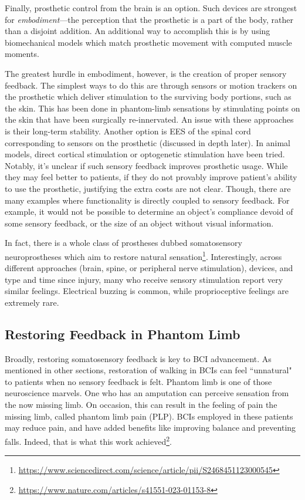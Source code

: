 Finally, prosthetic control from the brain is an option. Such devices are strongest for \textit{embodiment}---the perception that the prosthetic is a part of the body, rather than a disjoint addition. An additional way to accomplish this is by using biomechanical models which match prosthetic movement with computed muscle moments.\newline

The greatest hurdle in embodiment, however, is the creation of proper sensory feedback. The simplest ways to do this are through sensors or motion trackers on the prosthetic which deliver stimulation to the surviving body portions, such as the skin. This has been done in phantom-limb sensations by stimulating points on the skin that have been surgically re-innervated. An issue with these approaches is their long-term stability. Another option is EES of the spinal cord corresponding to sensors on the prosthetic (discussed in depth later). In animal models, direct cortical stimulation or optogenetic stimulation have been tried. Notably, it's unclear if such sensory feedback improves prosthetic usage. While they may feel better to patients, if they do not provably improve patient's ability to use the prosthetic, justifying the extra costs are not clear. Though, there are many examples where functionality is directly coupled to sensory feedback. For example, it would not be possible to determine an object's compliance devoid of some sensory feedback, or the size of an object without visual information. \newline

In fact, there is a whole class of prostheses dubbed somatosensory neuroprostheses which aim to restore natural sensation\footnote{\url{https://www.sciencedirect.com/science/article/pii/S2468451123000545}}. Interestingly, across different approaches (brain, spine, or peripheral nerve stimulation), devices, and type and time since injury, many who receive sensory stimulation report very similar feelings. Electrical buzzing is common, while proprioceptive feelings are extremely rare. 


\subsection{Restoring Feedback in Phantom Limb}

Broadly, restoring somatosensory feedback is key to BCI advancement. As mentioned in other sections, restoration of walking in BCIs can feel ``unnatural" to patients when no sensory feedback is felt. Phantom limb is one of those neuroscience marvels. One who has an amputation can perceive sensation from the now missing limb. On occasion, this can result in the feeling of pain the missing limb, called phantom limb pain (PLP). BCIs employed in these patients may reduce pain, and have added benefits like improving balance and preventing falls. Indeed, that is what this work achieved\footnote{\url{https://www.nature.com/articles/s41551-023-01153-8}}.\newline

